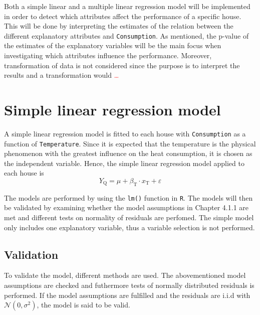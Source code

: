 \noindent Both a simple linear and a multiple linear regression model will be implemented in order to detect which attributes affect the performance of a specific house. This will be done by interpreting the estimates of the relation between the different explanatory attributes and \texttt{Consumption}. As mentioned, the p-value of the estimates of the explanatory variables will be the main focus when investigating which attributes influence the performance. Moreover, transformation of data is not considered since the purpose is to interpret the results and a transformation would \textcolor{red}{\dots}

\section{Simple linear regression model}
A simple linear regression model is fitted to each house with \texttt{Consumption} as a function of \texttt{Temperature}. Since it is expected that the temperature is the physical phenomenon with the greatest influence on the heat consumption, it is chosen as the independent variable. Hence, the simple linear regression model applied to each house is
\begin{equation}
    Y_{\text{Q}} = \mu + \beta_{\text{T}} \cdot x_{\text{T}} + \varepsilon
    \label{eq: simple}
\end{equation}

\noindent The models are performed by using the \texttt{lm()} function in \texttt{R}. The models will then be validated by examining whether the model assumptions in Chapter 4.1.1 are met and different tests on normality of residuals are perfomed. The simple model only includes one explanatory variable, thus a variable selection is not performed. 

\subsection{Validation}
To validate the model, different methods are used. The abovementioned model assumptions are checked and futhermore tests of normally distributed residuals is performed. If the model assumptions are fulfilled and the residuals are i.i.d with $\mathcal{N}(0,\sigma^2)$, the model is said to be valid. \\

